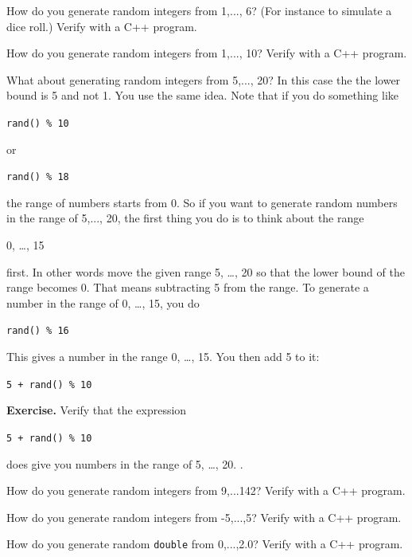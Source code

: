 \begin{ex}
How do you generate random integers from 1,..., 6? (For instance to simulate a dice roll.) Verify with a C++ program.
\end{ex}

\begin{ex}
How do you generate random integers from 1,..., 10? Verify with a C++ program.
\end{ex}

What about generating random integers from 5,..., 20? In this case the the lower bound is 5 and not 1. You use the same idea. Note that if you do something like
\begin{center}
\texttt{rand() \% 10}
\end{center}
or
\begin{center}
\texttt{rand() \% 18}
\end{center}
the range of numbers starts from 0. So if you want to generate random
numbers in the range of 5,..., 20, the first thing you do is to think
about the range
\begin{center}
0, \dots, 15
\end{center}
first. In other words move the given range 5, \ldots, 20 so that the
lower bound of the range becomes 0. That means subtracting 5 from the
range. To generate a number in the range of 0, \ldots, 15, you do
\begin{center}
\texttt{rand() \% 16}
\end{center}
This gives a number in the range 0, \ldots, 15. You then add 5 to it:
\begin{center}
\texttt{5 + rand() \% 10}
\end{center}
\textbf{Exercise.} Verify that the expression\\
\begin{center}
\texttt{5 + rand() \% 10}
\end{center}
does give you numbers in the range of 5, \dots, 20. .

\begin{ex}
How do you generate random integers from 9,...142? Verify with a C++ program.
\end{ex}

\begin{ex}
How do you generate random integers from -5,...,5? Verify with a C++ program.
\end{ex}

\begin{ex}
How do you generate random \verb`double` from 0,...,2.0? Verify with a C++ program.
\end{ex}

